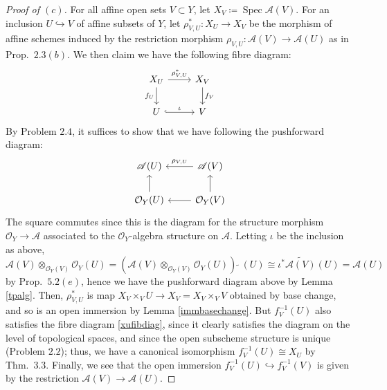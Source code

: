 \documentclass[12pt,letterpaper]{article}
\theoremstyle{definition}
\theoremstyle{remark}
\numberwithin{equation}{section}
\numberwithin{figure}{problem}
\DeclareMathOperator{\Spec}{Spec}
\newcommand{\OO}{\mathcal{O}}
\newcommand{\Aa}{\mathscr{A}}
\begin{document}
\begin{proof}[Proof of $(c)$]
  For all affine open sets $V \subset Y$, let $X_V \coloneqq \Spec\Aa(V)$. For an inclusion $U \hookrightarrow V$ of affine subsets of $Y$, let $\rho^*_{V,U} \colon X_U \to X_V$ be the morphism of affine schemes induced by the restriction morphism $\rho_{V,U} \colon \Aa(V) \to \Aa(U)$ as in Prop.~$2.3(b)$. We then claim we have the following fibre diagram:
  \begin{equation}\label{xufibdiag}
    \begin{tikzcd}
      X_U \rar{\rho^*_{V,U}}\dar[swap]{f_U} & X_V\dar{f_V}\\
      U \rar[hook]{\iota} & V
    \end{tikzcd}
  \end{equation}
  By Problem $2.4$, it suffices to show that we have following the pushforward diagram:
  \begin{equation*}
    \begin{tikzcd}
      \Aa(U) & \arrow{l}[swap]{\rho_{V,U}} \Aa(V)\\
      \OO_Y(U)\uar & \arrow{l} \OO_Y(V)\uar
    \end{tikzcd}
  \end{equation*}
  The square commutes since this is the diagram for the structure morphism $\OO_Y \to \Aa$ associated to the $\OO_Y$-algebra structure on $\Aa$. Letting $\iota$ be the inclusion as above,
  \begin{equation*}
    \Aa(V) \otimes_{\OO_Y(V)} \OO_Y(U) = (\Aa(V) \otimes_{\OO_Y(V)} \OO_Y(U))\:\tilde{}\:(U) \cong \iota^*\widetilde{\Aa(V)}(U) = \Aa(U)
  \end{equation*}
  by Prop.~$5.2(e)$, hence we have the pushforward diagram above by Lemma \ref{tpalg}. Then, $\rho_{V,U}^*$ is map $X_V \times_V U \to X_V = X_V \times_V V$ obtained by base change, and so is an open immersion by Lemma \ref{immbasechange}. But $f_V^{-1}(U)$ also satisfies the fibre diagram \eqref{xufibdiag}, since it clearly satisfies the diagram on the level of topological spaces, and since the open subscheme structure is unique (Problem $2.2$); thus, we have a canonical isomorphism $f_V^{-1}(U) \cong X_U$ by Thm.~3.3. Finally, we see that the open immersion $f_V^{-1}(U) \hookrightarrow f_V^{-1}(V)$ is given by the restriction $\Aa(V) \to \Aa(U)$.

\end{proof}
\end{document}
